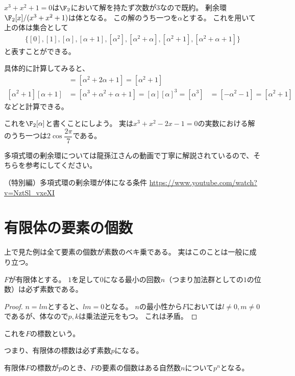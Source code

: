 \documentclass[uplatex]{jsarticle}
\begin{document}
\begin{eg}
  $x^3+x^2+1=0$は$\F_2$において解を持たず次数が$3$なので既約。
  剰余環$\F_2[x]/(x^3+x^2+1)$は体となる。
  この解のうち一つを$\alpha$とする。
  これを用いて上の体は集合として
  \begin{align*}
    \{[0],[1],[\alpha],[\alpha+1],[\alpha^2],[\alpha^2+\alpha],[\alpha^2+1],[\alpha^2+\alpha+1]\}
  \end{align*}
  と表すことができる。

  具体的に計算してみると、
  \begin{align*}
    [\alpha+1][\alpha+1]&=[\alpha^2+2\alpha+1]=[\alpha^2+1]\\
    [\alpha^2+1][\alpha+1]&=[\alpha^3+\alpha^2+\alpha+1]=[\alpha]
    [\alpha]^3=[\alpha^3]&=[-\alpha^2-1]=[\alpha^2+1]
  \end{align*}
  などと計算できる。

  これを$\F_2[\alpha]$と書くことにしよう。
  実は$x^3+x^2-2x-1=0$の実数における解のうち一つは$2\cos\dfrac{2\pi}{7}$である。
\end{eg}

多項式環の剰余環については龍孫江さんの動画で丁寧に解説されているので、そちらを参考にしてください。

（特別編）多項式環の剰余環が体になる条件
\url{https://www.youtube.com/watch?v=NztSl_vxeXI}

\section{有限体の要素の個数}
上で見た例は全て要素の個数が素数のベキ乗である。
実はこのことは一般に成り立つ。

\begin{prop}
  $F$が有限体とする。
  $1$を足して$0$になる最小の回数$n$（つまり加法群としての$1$の位数）は必ず素数である。
\end{prop}

\begin{proof}
  $n=lm$とすると、$lm=0$となる。
  $n$の最小性から$F$においては$l\neq0, m\neq0$であるが、体なので$p,k$は乗法逆元をもつ。
  これは矛盾。
\end{proof}

\begin{dfn}
  これを$F$の標数という。
\end{dfn}

つまり、有限体の標数は必ず素数$p$になる。

\begin{prop}
  有限体$F$の標数が$p$のとき、$F$の要素の個数はある自然数$n$について$p^n$となる。
\end{prop}
\end{document}
